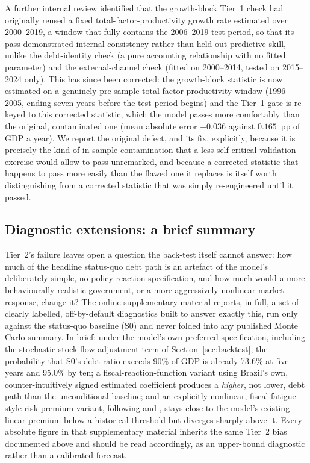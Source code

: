 \documentclass[11pt,a4paper]{article}
\begin{document}
A further internal review identified that the growth-block Tier~1 check had originally reused a fixed total-factor-productivity growth rate estimated over 2000--2019, a window that fully contains the 2006--2019 test period, so that its pass demonstrated internal consistency rather than held-out predictive skill, unlike the debt-identity check (a pure accounting relationship with no fitted parameter) and the external-channel check (fitted on 2000--2014, tested on 2015--2024 only). This has since been corrected: the growth-block statistic is now estimated on a genuinely pre-sample total-factor-productivity window (1996--2005, ending seven years before the test period begins) and the Tier~1 gate is re-keyed to this corrected statistic, which the model passes more comfortably than the original, contaminated one (mean absolute error $-0.036$ against $0.165$~pp of GDP a year). We report the original defect, and its fix, explicitly, because it is precisely the kind of in-sample contamination that a less self-critical validation exercise would allow to pass unremarked, and because a corrected statistic that happens to pass more easily than the flawed one it replaces is itself worth distinguishing from a corrected statistic that was simply re-engineered until it passed.

\subsection{Diagnostic extensions: a brief summary}
\label{sec:d4}

Tier~2's failure leaves open a question the back-test itself cannot answer: how much of the headline status-quo debt path is an artefact of the model's deliberately simple, no-policy-reaction specification, and how much would a more behaviourally realistic government, or a more aggressively nonlinear market response, change it? The online supplementary material reports, in full, a set of clearly labelled, off-by-default diagnostics built to answer exactly this, run only against the status-quo baseline (\textsc{S0}) and never folded into any published Monte Carlo summary. In brief: under the model's own preferred specification, including the stochastic stock-flow-adjustment term of Section~\ref{sec:backtest}, the probability that \textsc{S0}'s debt ratio exceeds 90\% of GDP is already 73.6\% at five years and 95.0\% by ten; a fiscal-reaction-function variant using Brazil's own, counter-intuitively signed estimated coefficient produces a \emph{higher}, not lower, debt path than the unconditional baseline; and an explicitly nonlinear, fiscal-fatigue-style risk-premium variant, following \citet{ghoshkimmendozaostryqureshi2013} and \citet{bi2012}, stays close to the model's existing linear premium below a historical threshold but diverges sharply above it. Every absolute figure in that supplementary material inherits the same Tier~2 bias documented above and should be read accordingly, as an upper-bound diagnostic rather than a calibrated forecast.
\end{document}
